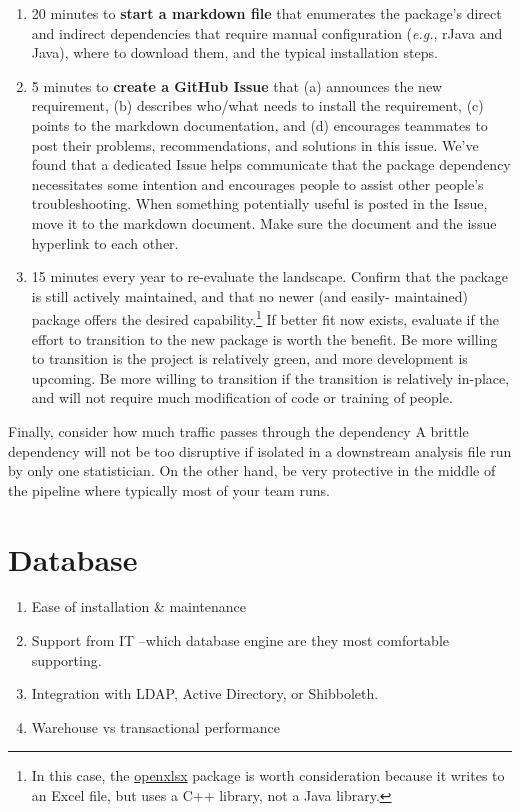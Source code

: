 \documentclass[
]{book}
\begin{document}
\begin{enumerate}
  \begin{enumerate}
  \def\labelenumii{\arabic{enumii}.}
  \item
    20 minutes to \textbf{start a markdown file} that enumerates the package's direct and indirect dependencies that require manual configuration (\emph{e.g.}, rJava and Java), where to download them, and the typical installation steps.
  \item
    5 minutes to \textbf{create a GitHub Issue} that (a) announces the new requirement, (b) describes who/what needs to install the requirement, (c) points to the markdown documentation, and (d) encourages teammates to post their problems, recommendations, and solutions in this issue. We've found that a dedicated Issue helps communicate that the package dependency necessitates some intention and encourages people to assist other people's troubleshooting. When something potentially useful is posted in the Issue, move it to the markdown document. Make sure the document and the issue hyperlink to each other.
  \item
    15 minutes every year to re-evaluate the landscape. Confirm that the package is still actively maintained, and that no newer (and easily- maintained) package offers the desired capability.\footnote{In this case, the \href{https://ycphs.github.io/openxlsx}{openxlsx} package is worth consideration because it writes to an Excel file, but uses a C++ library, not a Java library.} If better fit now exists, evaluate if the effort to transition to the new package is worth the benefit. Be more willing to transition is the project is relatively green, and more development is upcoming. Be more willing to transition if the transition is relatively in-place, and will not require much modification of code or training of people.
  \end{enumerate}
\end{enumerate}

Finally, consider how much traffic passes through the dependency A brittle dependency will not be too disruptive if isolated in a downstream analysis file run by only one statistician. On the other hand, be very protective in the middle of the pipeline where typically most of your team runs.

\hypertarget{database}{%
\section{Database}\label{database}}

\begin{enumerate}
\def\labelenumi{\arabic{enumi}.}
\item
  Ease of installation \& maintenance
\item
  Support from IT --which database engine are they most comfortable supporting.
\item
  Integration with LDAP, Active Directory, or Shibboleth.
\item
  Warehouse vs transactional performance
\end{enumerate}
\end{document}
